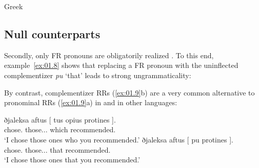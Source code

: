 \documentclass[output=paper]{langsci/langscibook}
\begin{document}
\ea\label{ex:01.8text} Greek\\

	\z
\z

\subsection{Null counterparts}
Secondly, only \gls{FR} pronouns are
obligatorily realized \parencite[22]{AleLawMeiWil2000}. To this end,
example~\eqref{ex:01.8} shows that replacing a \gls{FR} pronoun with the
uninflected complementizer \emph{pu} ‘that’ leads to strong ungrammaticality:

\ea {}\label{ex:01.8}
	\z
\z

By contrast, complementizer \glspl{RR} (\ref{ex:01.9}b)  are a very common alternative to
pronominal \glspl{RR} (\ref{ex:01.9}a) in  and in other languages:

\ea {}\label{ex:01.9}
	\ea
		\gll ðjaleksa aftus [ {tus opius} protines ].\\
        chose.\Fsg{} those.\M.\Pl.\Acc{} {} which recommended.\Ssg{}\\
		\glt \enquote*{I chose those ones who you recommended.}
	\ex
		\gll ðjaleksa aftus [ pu protines ].\\
        chose.\Fsg{} those.\M.\Pl.\Acc{} {} that recommended.\Ssg{}\\
		\glt \enquote*{I chose those ones that you recommended.}
	\z
\z
\end{document}
